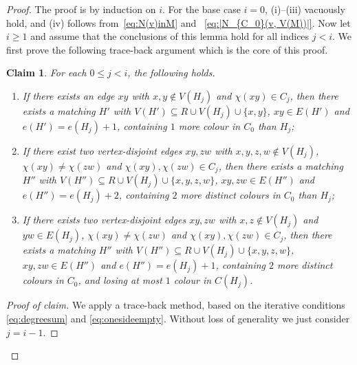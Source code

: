 \documentclass[11pt,reqno]{amsart}
\newenvironment{poc}{\begin{proof}[Proof of claim]\renewcommand*{\qedsymbol}{$\blacksquare$}}{\end{proof}}
\newtheorem{claim}[theorem]{Claim}
\theoremstyle{definition}
\theoremstyle{remark}
\renewcommand\leq{\leqslant}
\renewcommand\ge{\geqslant}
\begin{document}
\begin{proof}
The proof is by induction on $i$. For the base case $i=0$, (i)--(iii) vacuously hold, and (iv) follows from~\eqref{eq:N(v)inM} and ~\eqref{eq:|N_{C_0}(v, V(M))|}. Now let $i\ge 1$ and assume that the conclusions of this lemma hold for all indices $j<i$.  We first prove the following trace-back argument which is the core of this proof.

\begin{claim}\label{claim:traceback}
For each $0\leq j<i$, the following holds.
\begin{enumerate}
    \item If there exists an edge $xy$ with $x, y \notin V(H_{j})$ and $\chi(xy) \in C_{j}$, then there exists a matching $H'$ with $V(H') \subseteq R \cup V(H_{j}) \cup \{x,y\}$, $xy\in E(H')$ and $e(H')=e(H_{j})+1$, containing $1$ more colour in $C_0$ than $H_{j}$;

    \item If there exist two vertex-disjoint edges $xy,zw$ with $x,y,z,w \notin V(H_{j})$, $\chi(xy)\neq\chi(zw)$ and $\chi(xy),\chi(zw)\in C_j$, then there exists a matching $H''$ with $V(H'') \subseteq R \cup V(H_{j}) \cup \{x,y,z,w\}$, $xy,zw\in E(H'')$ and $e(H'')=e(H_{j})+2$, containing $2$ more distinct colours in $C_0$ than $H_{j}$; 
    
    \item If there exists two vertex-disjoint edges $xy,zw$ with $x,z\notin V(H_{j})$ and $yw\in E(H_j)$, $\chi(xy)\neq\chi(zw)$ and $\chi(xy),\chi(zw)\in C_j$, then there exists a matching $H''$ with $V(H'') \subseteq R \cup V(H_{j}) \cup \{x,y,z,w\}$, $xy,zw\in E(H'')$ and $e(H'')=e(H_{j})+1$, containing $2$ more distinct colours in $C_0$, and losing at most $1$ colour in $C(H_{j})$.
    
\end{enumerate}
\end{claim}

\begin{poc}
We apply a trace-back method, based on the iterative conditions \eqref{eq:degreesum} and \eqref{eq:onesideempty}. Without loss of generality we just consider $j=i-1$.


\end{poc}
\end{proof}
\end{document}
